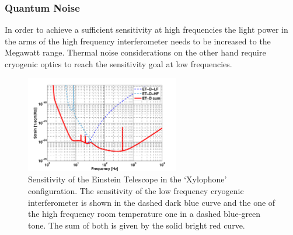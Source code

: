 \subsubsection{Quantum Noise} 
In order to achieve a sufficient sensitivity at high frequencies the light power in the arms of the high frequency interferometer needs to be increased to the Megawatt range. Thermal noise considerations on the other hand require cryogenic optics to reach the sensitivity goal at low frequencies. 

\begin{figure}
	\centering
		\includegraphics[width=0.6\textwidth]{Sec_Introduction/ET_D_spectrum.pdf}
	\caption{Sensitivity of the Einstein Telescope in the `Xylophone' configuration. The sensitivity of the low frequency cryogenic interferometer is shown in the dashed dark blue curve and the one of the high frequency room temperature one in a dashed blue-green tone. The sum of both is given by the solid bright red curve.}
	\label{fig:ET_sensitivity}
\end{figure}

